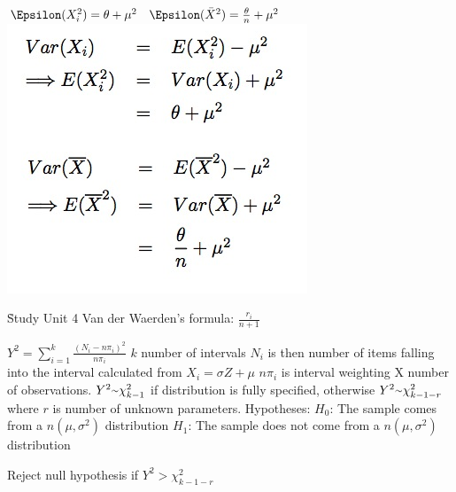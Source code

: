 \documentclass{examnotes}
\begin{document}
$\Epsilon(X_i^2)=\theta+\mu^2 \quad \Epsilon(\bar{X}^2)=\frac{\theta}{n}+\mu^2$
\includegraphics[scale=0.45]{./img/proof1.jpg}

\h{Study Unit 4} 
Van der Waerden's formula: $\displaystyle\frac{r_i}{n+1}$

\vspace{6pt}
$Y^2=\displaystyle\sum_{i=1}^k \frac{(N_i - n\pi_i)^2}{n\pi_i}$
$k$ number of intervals
$N_i$ is then number of items falling into the interval calculated from $X_i=\sigma Z+\mu$
$n\pi_i$ is interval weighting X number of observations. 
\vspace{6pt}
\vspace{6pt}
$Y^2 \mytilde \chi^2_{k-1}$ if distribution is fully specified, otherwise 
$Y^2 \mytilde \chi^2_{k-1-r}$ where $r$ is number of unknown parameters.
\vspace{6pt}
Hypotheses:
$H_0$: The sample comes from a $n(\mu,\sigma^2)$ distribution
$H_1$: The sample does not come from a $n(\mu,\sigma^2)$ distribution

Reject null hypothesis if $Y^2>\chi^2_{k-1-r}$
\end{document}
